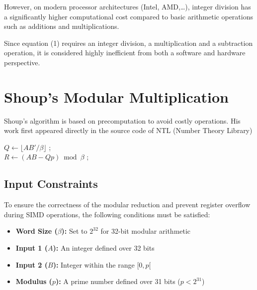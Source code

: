 \documentclass{article}
\begin{document}
However, on modern processor architectures (Intel, AMD,\dots), integer division has a significantly higher computational cost compared to basic arithmetic operations such as additions and multiplications.

Since equation (1) requires an integer division, a multiplication and a subtraction operation, it is considered highly inefficient from both a software and hardware perspective.



\section{Shoup's Modular Multiplication}
Shoup's algorithm is based on precomputation to avoid costly operations. His work first appeared directly in the source code of NTL (Number Theory Library)\cite{shoupNTL}

\begin{algorithm}[H]
    \caption{Shoup's modular multiplication algorithm}


    \Input{$A, B \in [0, p[$, we suppose that $p < \beta$/2 \\
    \hspace{1.2cm} precompute $B' = \lfloor B\beta/p \rfloor$}

    \BlankLine

    $Q \leftarrow \lfloor AB'/\beta \rfloor$ \quad ;\\
    $R \leftarrow (AB - Qp) \bmod \beta$ \quad ;

\end{algorithm}


\subsection{Input Constraints}
To ensure the correctness of the modular reduction and prevent register overflow during SIMD operations,
the following conditions must be satisfied:
\begin{itemize}
    \item \textbf{Word Size ($\beta$):} Set to $2^{32}$ for 32-bit modular arithmetic
    \item \textbf{Input 1 ($A$):} An integer defined over 32 bits
    \item \textbf{Input 2 ($B$):} Integer within the range $[0, p[$
    \item \textbf{Modulus ($p$):} A prime number defined over 31 bits ($p < 2^{31}$)
\end{itemize}
\end{document}
